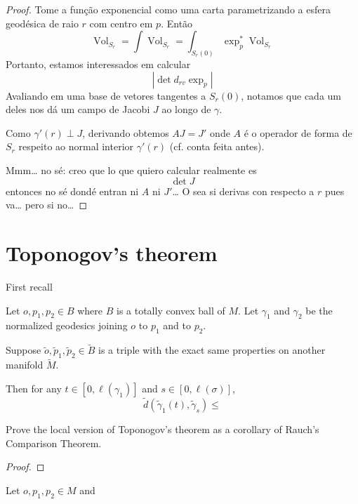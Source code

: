 \begin{proof}
Tome a função exponencial como uma carta parametrizando a esfera geodésica de
raio $r$ com centro em $p$. Então
$$
\operatorname{Vol}_{S_r}=\int
\operatorname{Vol}_{S_r}=
\int_{S_r(0)}\operatorname{exp}_p^*\operatorname{Vol}_{S_r}
$$
Portanto, estamos interessados em calcular 
$$
|\det d_{rv} \operatorname{exp}_p|
$$
Avaliando em uma base de vetores tangentes a $S_r(0)$, notamos que cada um deles
nos dá um campo de Jacobi $J$ ao longo de $\gamma$.

Como $\gamma'(r)\perp J$, derivando obtemos $A J=J'$ onde $A$ é o operador de
forma de $S_r$ respeito ao normal interior $\gamma'(r)$ (cf. conta feita antes).

Mmm… no sé: creo que lo que quiero calcular realmente es
$$
\det J
$$
entonces no sé dondé entran ni $A$ ni $J'$… O sea si derivas con respecto a $r$
pues va… pero si no…

\end{proof}

\section{Toponogov's theorem}
\label{section-toponogov}

First recall

\begin{theorem}
\label{theorem-toponogov,local}
Let $o,p_1,p_2 \in B$ where $B$ is a totally convex ball of $M$. Let $\gamma_1$
and $\gamma_2$ be the normalized geodesics joining $o$ to $p_1$ and to $p_2$.

Suppose $\tilde{o}, \tilde{p}_1,\tilde{p}_2 \in \tilde{B}$ is a triple with the
exact same properties on another manifold $\tilde{M}$.

Then for any $t \in [0,\ell(\gamma_1)]$ and $s \in [0,\ell(\sigma)]$,
$$
\tilde{d}(\tilde{\gamma}_1(t),\tilde{\gamma}_s)\leq 
$$

\end{theorem}

\begin{exercise}[Lista 7]
\label{exercise-toponogov-from-rauch}
Prove the local version of Toponogov's theorem as a corollary of Rauch's
Comparison Theorem.
\end{exercise}

\begin{proof}

\end{proof}

\begin{theorem}
\label{theorem-toponogov-hinge}
Let $o,p_1,p_2 \in M$ and 
\end{theorem}






